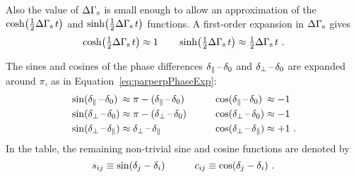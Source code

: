 Also the value of $\DGs$ is small enough to allow an approximation of the $\cDGs$ and $\sDGs$ functions. A first-order expansion in $\DGs$
gives
\begin{equation}
  \cDGs \approx 1 \qquad \sDGs \approx \tfrac{1}{2}\DGs\,t \ .
\end{equation}

The sines and cosines of the phase differences $\delparzero$ and $\delperpzero$ are expanded around $\pi$, as in
Equation~\ref{eq:parperpPhaseExp}:
\begin{equation}
  \begin{alignedat}{4}
    &\sin(\delparzero)  &&\approx \pi - (\delparzero) \qquad\quad &&\cos(\delparzero)  &&\approx -1  \\
    &\sin(\delperpzero) &&\approx \pi - (\delperpzero)            &&\cos(\delperpzero) &&\approx -1  \\
    &\sin(\delperppar)  &&\approx \delperppar                     &&\cos(\delperppar)  &&\approx +1  \ .
  \end{alignedat}
\end{equation}
In the table, the remaining non-trivial sine and cosine functions are denoted by
\begin{equation}
  \sij{i}{j} \equiv \sin(\delta_j - \delta_i) \qquad\quad
  \cij{i}{j} \equiv \cos(\delta_j - \delta_i) \ .
\end{equation}

